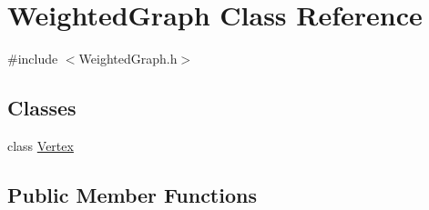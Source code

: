 \hypertarget{class_weighted_graph}{\section{Weighted\-Graph Class Reference}
\label{class_weighted_graph}
}


{\ttfamily \#include $<$Weighted\-Graph.\-h$>$}

\subsection*{Classes}
\begin{DoxyCompactItemize}
\item 
class \hyperlink{class_weighted_graph_1_1_vertex}{Vertex}
\end{DoxyCompactItemize}
\subsection*{Public Member Functions}
